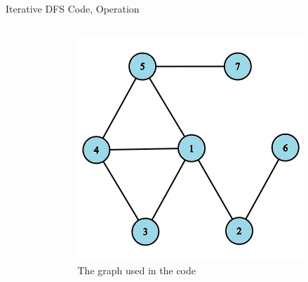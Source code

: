 \documentclass[aspectratio=169]{beamer}%
\begin{document}
\begin{frame}{Iterative DFS Code, Operation}
    \begin{columns}
        \begin{column}{0.70\textwidth}
            
        \end{column}
        \hfill
        \begin{column}{0.25\textwidth}
            \begin{figure}
                \centering
                \includegraphics[width = .9\linewidth]{dfs 21.png}
                \caption{The graph used in the code}
            \end{figure}
        \end{column}
    \end{columns}
\end{frame}
\end{document}
